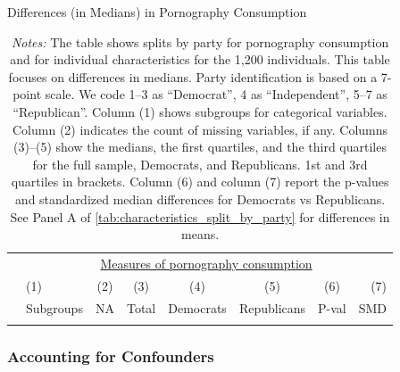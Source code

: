 \documentclass[12pt,twoside]{article}
\begin{document}
\begin{table}[ht] \centering \small \setlength\tabcolsep{5 pt}
	\caption{Differences (in Medians) in Pornography Consumption}
	\label{tab:characteristics_split_by_party_medians}
	\begin{adjustbox}{max width=\textwidth}
		\begin{tabular}{@{\hspace{0\tabcolsep}}llrcccrr@{\hspace{0\tabcolsep}}}
			\toprule
			&\multicolumn{7}{c}{\underline{Measures of pornography consumption}}\\
			&\multicolumn{1}{l}{(1)}&\multicolumn{1}{c}{(2)}&\multicolumn{1}{c}{(3)}&\multicolumn{1}{c}{(4)}&\multicolumn{1}{c}{(5)}&\multicolumn{1}{c}{(6)}&\multicolumn{1}{r}{(7)}\\			
			&\multicolumn{1}{l}{Subgroups}&\multicolumn{1}{c}{NA}&\multicolumn{1}{c}{Total}&\multicolumn{1}{c}{Democrats}&\multicolumn{1}{c}{Republicans}&\multicolumn{1}{c}{P-val}&\multicolumn{1}{r}{SMD}\\
			\cmidrule{2-8}
			\\
			\bottomrule
		\end{tabular}
	\end{adjustbox}
	\caption*{\scriptsize \emph{Notes:}
		The table shows splits by party for pornography consumption and for individual characteristics for the 1,200 individuals.
		This table focuses on differences in medians.
		Party identification is based on a 7-point scale. We code 1--3 as ``Democrat'', 4 as ``Independent'', 5--7 as ``Republican''.
		Column (1) shows subgroups for categorical variables.
		Column (2) indicates the count of missing variables, if any.
		Columns (3)--(5) show the medians, the first quartiles, and the third quartiles for the full sample, Democrats, and Republicans.
		1st and 3rd quartiles in brackets.
		Column (6) and column (7) report the p-values and standardized median differences for Democrats vs Republicans.
		See Panel A of \cref{tab:characteristics_split_by_party} for differences in means.
	}
\end{table}
\FloatBarrier
\clearpage
\subsubsection{Accounting for Confounders}
\end{document}
